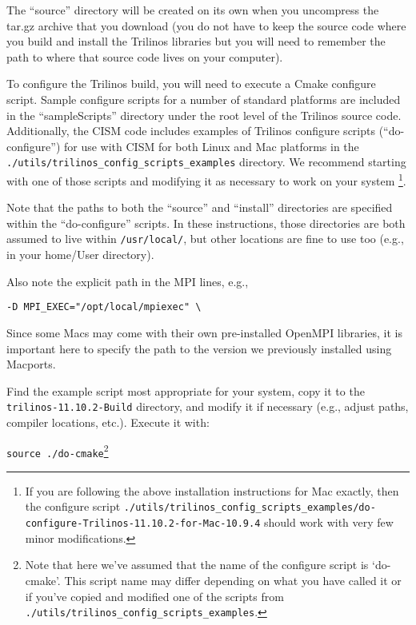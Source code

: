 The ``source'' directory will be created on its own when you uncompress the tar.gz archive 
that you download (you do not have to keep the source code where you build and install 
the Trilinos libraries but you will need to remember the path to where that source code 
lives on your computer). 

To configure the Trilinos build, you will need to execute a Cmake configure script. 
Sample configure scripts for a number of standard platforms are included in the ``sampleScripts''
directory under the root level of the Trilinos source code. 
Additionally, the CISM code includes examples of Trilinos configure scripts (``do-configure'') 
for use with CISM for both Linux and Mac platforms in the 
\texttt{./utils/trilinos\_config\_scripts\_examples} directory. 
We recommend starting with one of those scripts and modifying it as
necessary to work on your system \footnote{If you are following the above installation instructions for
Mac exactly, then the configure script 
\texttt{./utils/trilinos\_config\_scripts\_examples/do-configure-Trilinos-11.10.2-for-Mac-10.9.4} should 
work with very few minor modifications.}.

Note that the paths to both the ``source'' and ``install'' directories are specified within the ``do-configure'' scripts. In these instructions, those directories are both assumed to live within \texttt{/usr/local/},
but other locations are fine to use too (e.g., in your home/User directory).

\begin{mdframed}[style=mac] %
Also note the explicit path in the MPI lines, e.g.,

\begin{verbatim}
-D MPI_EXEC="/opt/local/mpiexec" \
\end{verbatim}

Since some Macs may come with their own pre-installed OpenMPI libraries, it is important here to specify the path to the version we previously installed using Macports.
\end{mdframed}              %

Find the example script most appropriate for your system, copy it to the \texttt{trilinos-11.10.2-Build} directory, and modify it if necessary (e.g., adjust paths, compiler locations, etc.).
Execute it with: 

\texttt{source ./do-cmake}\footnote{Note that here we've assumed that the name of the configure script is `do-cmake'. This script name may differ depending on what you have called it or if you've copied and modified one of the scripts from \texttt{./utils/trilinos\_config\_scripts\_examples}.}

